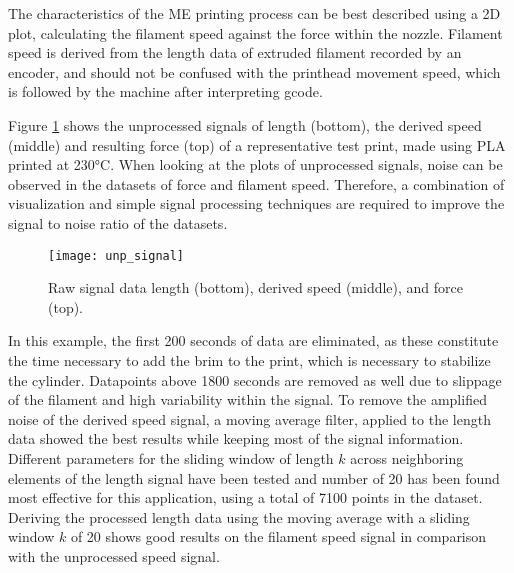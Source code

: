 \documentclass[main.tex]{subfiles}
\begin{document}
The characteristics of the ME printing process can be best described using a 2D plot, calculating the filament speed against the force within the nozzle. Filament speed is derived from the length data of extruded filament recorded by an encoder, and should not be confused with the printhead movement speed, which is followed by the machine after interpreting gcode.
 
Figure \ref{fig:unp_data} shows the unprocessed signals of length (bottom), the derived speed (middle) and resulting force (top) of a representative test print, made using PLA printed at 230°C. When looking at the plots of unprocessed signals, noise can be observed in the datasets of force and filament speed. Therefore, a combination of visualization and simple signal processing techniques are required to improve the signal to noise ratio of the datasets.

\begin{figure}[!htbp]
	\center
	\texttt{[image: unp\_signal]}
	\caption{Raw signal data length (bottom), derived speed (middle), and force (top).} \label{fig:unp_data}
\end{figure}

In this example, the first 200 seconds of data are eliminated, as these constitute the time necessary to add the brim to the print, which is necessary to stabilize the cylinder. Datapoints above 1800 seconds are removed as well due to slippage of the filament and high variability within the signal. To remove the amplified noise of the derived speed signal, a moving average filter, applied to the length data showed the best results while keeping most of the signal information. Different parameters for the sliding window of length $k$ across neighboring elements of the length signal have been tested and number of 20 has been found most effective for this application, using a total of 7100 points in the dataset. Deriving the processed length data using the moving average with a sliding window $k$ of 20 shows good results on the filament speed signal in comparison with the unprocessed speed signal.  

% 
\end{document}
